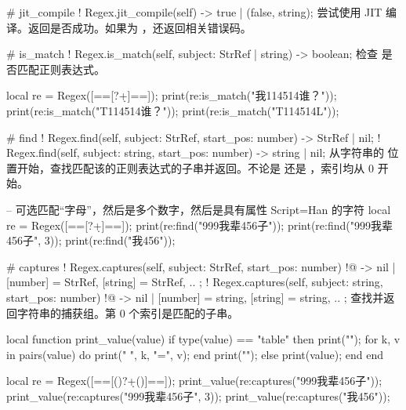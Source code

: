 \documentclass[class=article,doc={kv-usage}]{cusdoc}
\begin{document}
\begin{luadoc*}{}
# jit_compile
! Regex.jit_compile(self) -> true | (false, string);
尝试使用 JIT 编译。返回是否成功。如果为 ，还返回相关错误码。
\end{luadoc*}

\begin{luadoc*}{}
# is_match
! Regex.is_match(self, subject: StrRef | string) -> boolean;
检查  是否匹配正则表达式。
\end{luadoc*}

\begin{luarun}{}
local re = Regex([==[\w?\d+]==]);
print(re:is_match("我114514谁？"));
print(re:is_match("T114514谁？"));
print(re:is_match("T114514L"));
\end{luarun}

\begin{luadoc*}{}
# find
! Regex.find(self, subject: StrRef, start_pos: number) -> StrRef | nil;
! Regex.find(self, subject: string, start_pos: number) -> string | nil;
从字符串的  位置开始，查找匹配该的正则表达式的子串并返回。不论是  还是 ，索引均从 0 开始。
\end{luadoc*}

\begin{luarun}{}
-- 可选匹配“字母”，然后是多个数字，然后是具有属性 Script=Han 的字符
local re = Regex([==[\pL?\d+]==]);
print(re:find("999我辈456子"));
print(re:find("999我辈456子", 3));
print(re:find("我456"));
\end{luarun}

\begin{luadoc*}{}
# captures
! Regex.captures(self, subject: StrRef, start_pos: number)
!@              -> nil | { [number] = StrRef, [string] = StrRef, .. };
! Regex.captures(self, subject: string, start_pos: number)
!@              -> nil | { [number] = string, [string] = string, .. };
查找并返回字符串的捕获组。第 0 个索引是匹配的子串。
\end{luadoc*}

\begin{luarun}{}
local function print_value(value)
    if type(value) == "table" then
        print("{");
        for k, v in pairs(value) do
            print(" ", k, "=", v);
        end
        print("}");
    else
        print(value);
    end
end

local re = Regex([==[(\pL)?\d+()]==]);
print_value(re:captures("999我辈456子"));
print_value(re:captures("999我辈456子", 3));
print_value(re:captures("我456"));
\end{luarun}
\end{document}
